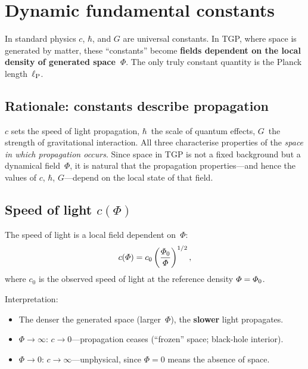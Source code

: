\section{Dynamic fundamental constants}\label{sec:stale}

In standard physics $c$, $\hbar$, and $G$ are universal constants.
In TGP, where space is generated by matter, these ``constants'' become
\textbf{fields dependent on the local density of generated space~$\Phi$}.
The only truly constant quantity is the Planck length~$\ell_{\mathrm{P}}$.

\subsection{Rationale: constants describe propagation}\label{ssec:uzasadnienie}

$c$ sets the speed of light propagation,
$\hbar$~the scale of quantum effects,
$G$~the strength of gravitational interaction.
All three characterise properties of the \emph{space in which propagation occurs}.
Since space in TGP is not a fixed background but a dynamical field~$\Phi$,
it is natural that the propagation properties---and hence the values
of $c$, $\hbar$, $G$---depend on the local state of that field.

\subsection{Speed of light $c(\Phi)$}\label{ssec:c}

\begin{axiom}\label{ax:c}
The speed of light is a local field dependent on~$\Phi$:
\begin{equation}\label{eq:cPhi}
    c(\varPhi) = c_0 \left(\frac{\varPhi_0}{\varPhi}\right)^{1/2},
\end{equation}
where $c_0$ is the observed speed of light at the reference
density $\varPhi = \varPhi_0$.
\end{axiom}

Interpretation:
\begin{itemize}[nosep]
  \item The denser the generated space (larger~$\Phi$),
        the \textbf{slower} light propagates.
  \item $\Phi \to \infty$: $c \to 0$---propagation ceases
        (``frozen'' space; black-hole interior).
  \item $\Phi \to 0$: $c \to \infty$---unphysical, since
        $\Phi = 0$ means the absence of space.
\end{itemize}

